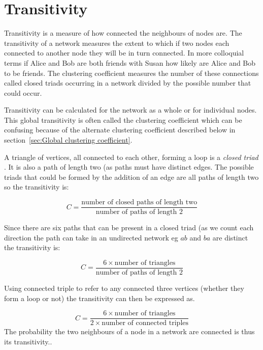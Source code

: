 



\section{Transitivity}
\label{sec:transitivity}
Transitivity is a measure of how connected the neighbours of nodes are. 
The transitivity of a network measures the extent to which if two nodes each connected to another node they will be in turn connected. In more colloquial terms if Alice and Bob are both friends with Susan how likely are Alice and Bob to be friends. The clustering coefficient measures the number of these connections called closed triads occurring in a network 
divided by the possible number that could occur.

Transitivity can be calculated for the network as a whole or for individual nodes. This global transitivity is often called the clustering coefficient which can be confusing because of the alternate clustering coefficient described below in section~\ref{sec:Global clustering coefficient}. 

A triangle of vertices,  all connected to each other, forming a loop is  a \textit{closed triad} \cite{newman2018networks}. It is also a path of length two (as paths must have distinct edges. The possible triads that could be formed by the addition of an edge are all paths of length two so the transitivity is:

\begin{equation}
    C = \frac{\textrm{number of closed paths of length two}}{\textrm{number of paths of length 2}}
\end{equation}

Since there are six paths that can be present in a closed triad (as we count each direction the path can take in an undirected network eg $ab$ and $ba$ are distinct the transitivity is:

\begin{equation}
    C = \frac{6 \times \textrm{number of triangles}}{\textrm{number of paths of length 2}}
\end{equation}

Using connected triple to refer to any connected three vertices (whether they form a loop or not) the transitivity can then be expressed as.

\begin{equation}
    C = \frac{6 \times \textrm{number of triangles}}{2 \times \textrm{number of connected triples}}
\end{equation}
The probability the two neighbours of a node in a network are connected is thus its transitivity.\cite{newman2018networks}. 


